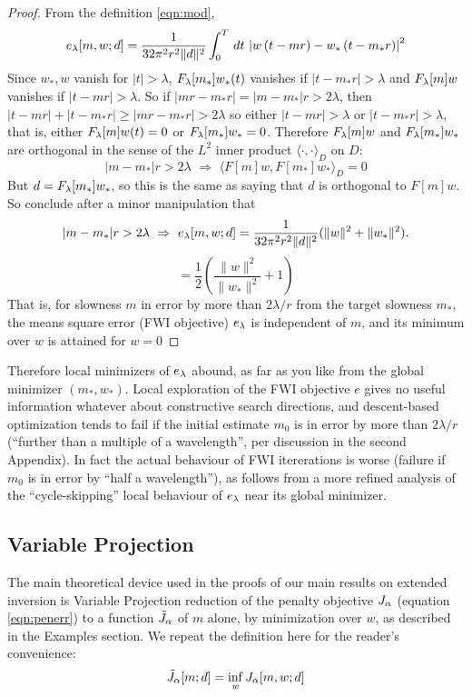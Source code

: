 \begin{proof} From the definition \ref{eqn:mod},
\[
 e_{\lambda}[m,w;d] =  \frac{1}{32\pi^2
    r^2\|d\|^2}\int_0^T\,dt\,\left|w\left(t-mr\right)-w_*\left(t-m_*r\right)\right|^2
\]
Since $w_*, w$ vanish for $|t|>\lambda$,
$F_{\lambda}[m_*]w_*(t)$ vanishes if $|t-m_*r|>\lambda$ and $F_{\lambda}[m]w$ vanishes if $|t-mr|>\lambda$. So if $|mr-m_*r|
= |m-m_*|r > 2\lambda$, then $|t-mr|+|t-m_*r| \ge |mr-m_*r| >
2\lambda$ so either $|t-mr|>\lambda$ or $|t-m_*r|>\lambda$, that is,
either $F_{\lambda}[m]w(t)=0$ or $F_{\lambda}[m_*]w_*=0$. Therefore $F_{\lambda}[m]w$ and
$F_{\lambda}[m_*]w_*$ are orthogonal in the sense of the $L^2$ inner product
$\langle \cdot,\cdot \rangle_D$ on $D$:
\begin{equation}
  \label{eqn:ortho}
  |m- m_*|r > 2\lambda \,\, \Rightarrow \,\, \langle F[m]w,
  F[m_*]w_*\rangle_D = 0
\end{equation}
But $d = F_{\lambda}[m_*]w_*$, so this is the same as saying that $d$ is
orthogonal to $F[m]w$. So conclude after a minor manipulation that
\[
  |m- m_*|r > 2\lambda \,\, \Rightarrow \,\, e_{\lambda}[m,w;d]=\frac{1}{32\pi^2 
    r^2\|d\|^2}(\|w\|^2 + \|w_*\|^2).
\]
\begin{equation}
  \label{eqn:iso}
  = \frac{1}{2}\left(\frac{\|w\|^2}{\|w_*\|^2} + 1 \right)
\end{equation}
That is, for slowness $m$ in error by more than $2\lambda/r$ from the 
target slowness $m_*$, the means square error (FWI objective) $e_{\lambda}$ is independent of
$m$, and its minimum over $w$ is attained for $w=0$
\end{proof}

Therefore local minimizers of $e_{\lambda}$ abound, as far as you like from the
global minimizer $(m_*,w_*)$. Local exploration of the FWI objective
$e$ gives no useful information whatever about constructive search
directions, and descent-based optimization tends to fail if the
initial estimate $m_0$ is in error by more than $2\lambda/r$
(``further than a multiple of a wavelength'', per discussion
in the second Appendix). In fact the actual behaviour of FWI itererations is worse
(failure if $m_0$ is in error by ``half a wavelength''), as follows
from a more refined analysis of the ``cycle-skipping'' local behaviour of $e_{\lambda}$ near its
global minimizer.

\subsection{Variable Projection}
The main theoretical device used in the proofs of our main results on 
extended inversion is Variable Projection reduction of the penalty objective $J_{\alpha}$
(equation \ref{eqn:penerr}) to a function $\tilde{J}_{\alpha}$ of 
$m$ alone, by minimization over $w$, as described in the Examples
section. We repeat the definition here for the reader's convenience:
\begin{equation}
  \label{eqn:redexp}
  \tilde{J}_{\alpha}[m;d] = \inf_w J_{\alpha}[m,w;d]
\end{equation}

